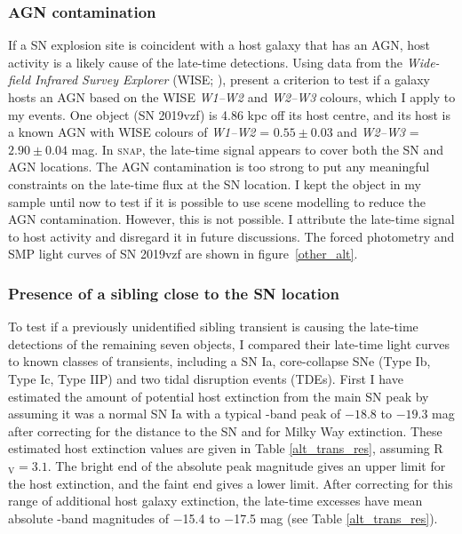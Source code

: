 \documentclass[a4paper,oneside,12pt, class=Latex/Classes/PhDthesisPSnPDF, crop=false]{standalone}
\begin{document}
\subsubsection{AGN contamination}
\label{sec:agn_cont}
If a SN explosion site is coincident with a host galaxy that has an AGN, host activity is a likely cause of the late-time detections. Using data from the \textit{Wide-field Infrared Survey Explorer} (WISE; \citealt{WISE}), \citet{WISE_crit} present a criterion to test if a galaxy hosts an AGN based on the WISE \textit{W1--W2} and \textit{W2--W3} colours, which I apply to my events. One object (SN 2019vzf) is 4.86 kpc off its host centre, and its host is a known AGN with WISE colours of \textit{W1--W2} = $0.55\pm0.03$ and \textit{W2--W3} = $2.90\pm0.04$ mag. In \textsc{snap}, the late-time signal appears to cover both the SN and AGN locations. The AGN contamination is too strong to put any meaningful constraints on the late-time flux at the SN location. I kept the object in my sample until now to test if it is possible to use scene modelling to reduce the AGN contamination. However, this is not possible. I attribute the late-time signal to host activity and disregard it in future discussions. The forced photometry and SMP light curves of SN 2019vzf are shown in figure~\ref{other_alt}. 


\subsubsection{Presence of a sibling close to the SN location}
To test if a previously unidentified sibling transient is causing the late-time detections of the remaining seven objects, I compared their late-time light curves to known classes of transients, including a SN Ia, core-collapse SNe (Type Ib, Type Ic, Type IIP) and two tidal disruption events (TDEs). First I have estimated the amount of potential host extinction from the main SN peak by assuming it was a normal SN Ia with a typical \ztfg-band peak of $-18.8$ to $-19.3$ mag after correcting for the distance to the SN and for Milky Way extinction. These estimated host extinction values are given in Table \ref{alt_trans_res}, assuming R$_\text{V} = 3.1$. The bright end of the absolute peak magnitude gives an upper limit for the host extinction, and the faint end gives a lower limit. After correcting for this range of additional host galaxy extinction, the late-time excesses have mean absolute \ztfr-band magnitudes of $-$15.4 to $-$17.5 mag (see Table \ref{alt_trans_res}).\\
\end{document}
